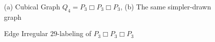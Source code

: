 \documentclass[12pt, a4paper]{report}
\theoremstyle{definition}
\theoremstyle{definition}
\theoremstyle{remark}
\theoremstyle{definition}
\theoremstyle{definition}
\begin{document}
\begin{figure}[H]
	\begin{subfigure}[b]{0.48\textwidth}
	\subcaption{}
	\end{subfigure}
	\begin{subfigure}[b]{0.48\textwidth}
	\subcaption{}
	\end{subfigure}
	\caption{(a) Cubical Graph $Q_4=P_3\Box P_3\Box P_3$, (b) The same simpler-drawn graph}
\end{figure}

\begin{figure}[H]
\caption{Edge Irregular $29$-labeling of $P_3\Box P_3\Box P_3$}
\end{figure}
\end{document}
